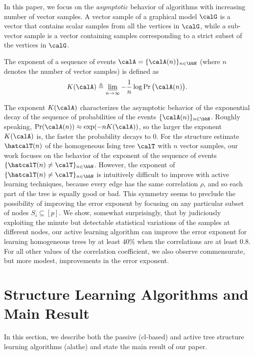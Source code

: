 \documentclass[11pt,onecolumn]{article}
\begin{document}
In this paper, we focus on the \emph{asymptotic} behavior  of algorithms with   increasing number of vector samples. A vector sample of a graphical model $\calG$ is a vector that contains scalar samples from  all the vertices in $\calG$, while a 
sub-vector sample is a vector containing samples corresponding to a strict subset of the vertices in $\calG$. %
\begin{definition}[Exponent]
	The exponent of a sequence of events $\calA=\{\calA(n)\}_{n\in\bbN}$ (where $n$ denotes the number of vector samples) is defined as
	\begin{align}
		K(\calA)\triangleq \varliminf_{n\rightarrow \infty}-\frac{1}{n}\log\Pr\big(\calA(n)\big).
	\end{align}
\end{definition}
The exponent $K(\calA)$ characterizes the asymptotic behavior of the exponential decay of the sequence of  probabilities of the events $\{\calA (n)\}_{n\in\bbN}$. Roughly speaking, 
$\Pr(\calA(n))\approx \exp (-n K(\calA) )$, 
so the larger the exponent $K(\calA)$ is, the faster the   probability decays to $0$.
For the structure estimate $\hatcalT(n)$ of the homogeneous Ising tree $\calT$ with $n$ vector samples, our work focuses on the behavior of the exponent of the sequence of events $\{\hatcalT(n)\neq \calT\}_{n\in\bbN}$. However, the exponent of $\{\hatcalT(n)\neq \calT\}_{n\in\bbN}$ is intuitively difficult to improve with active learning techniques, because every edge has the same correlation $\rho$, and so each part of the tree is equally good or bad. This   symmetry seems to preclude the possibility of improving the error exponent by focusing on any   particular subset of nodes $S_{i} \subseteq[p]$. We show, somewhat surprisingly,
that by judiciously exploiting the minute but detectable statistical variations of the samples at
different nodes, our active learning algorithm can improve the error exponent for learning homogeneous trees by at least $40\%$
when the correlations are at least $0.8$. For all other values of the correlation coefficient, we also
observe commensurate, but more modest, improvements in the error exponent.

\section{Structure Learning Algorithms and Main Result} \label{sec:structure}
In this section, we describe both the passive (\ac{cl}-based) and active tree structure learning algorithms  (\ac{alathe}) and state the main result of our paper.
\end{document}
